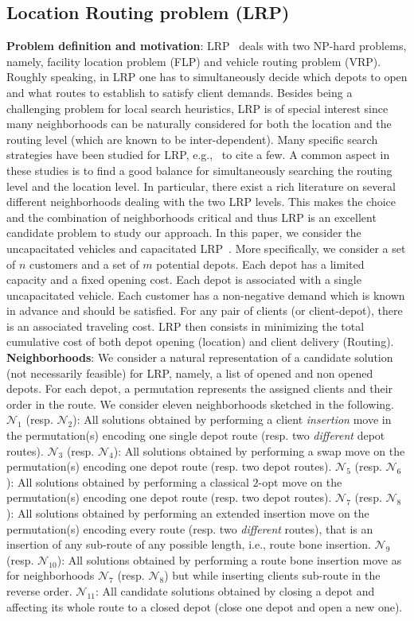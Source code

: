 \documentclass{acm_proc_article-sp}
\newcommand{\m}[1]{\mathcal{#1}}
\begin{document}
\subsection{Location Routing problem (LRP)}
\textbf{Problem definition and motivation}: LRP~\cite{lrp,Min} deals with two NP-hard problems, namely, facility location problem (FLP) and vehicle routing problem (VRP). Roughly speaking, in LRP one has to simultaneously decide which depots to open and what routes to establish to satisfy client demands. 
Besides being a challenging problem for local search heuristics, LRP is of special interest since many neighborhoods can be naturally considered for both the location and the routing level (which are known to be inter-dependent). Many specific search strategies have been studied for LRP, e.g.,~\cite{galrp,lrpvns,duhamel} to cite a few. A common aspect in these studies is to find a good balance for simultaneously searching the routing level and the location level. In particular, there exist a rich literature on several different neighborhoods dealing with the two LRP levels. This makes the choice and the combination of neighborhoods critical and thus LRP is an excellent candidate problem to study our approach. In this paper, we consider the uncapacitated vehicles and capacitated LRP~\cite{ulrp}. More specifically, we consider a set of $n$ customers and a set of $m$ potential depots. Each depot has a limited capacity and a fixed opening cost. Each depot is associated with a single uncapacitated vehicle. Each customer has a non-negative demand which is known in advance and should be satisfied. For any pair of clients (or client-depot), there is an associated traveling cost. LRP then consists in minimizing the total cumulative cost of both depot opening (location) and client delivery (Routing).\\
\textbf{Neighborhoods}: We consider a natural representation of a candidate solution (not necessarily feasible) for LRP, namely, a list of opened and non opened depots. For each depot, a permutation represents the assigned clients and their order in the route. We consider eleven neighborhoods sketched in the following. $\m{N}_1$ (resp. $\m{N}_2$): All solutions obtained by performing a client \emph{insertion} move in the permutation(s) encoding one single depot route (resp. two \emph{different} depot routes). $\m{N}_3$ (resp. $\m{N}_4$): All solutions obtained by performing a swap move on the permutation(s) encoding one depot route (resp. two depot routes). $\m{N}_5$ (resp. $\m{N}_6$): All solutions obtained by performing a classical $2$-opt move on the permutation(s) encoding one depot route (resp. two depot routes). $\m{N}_7$ (resp. $\m{N}_8$): All solutions obtained by performing an extended insertion move on the permutation(s) encoding every route (resp. two \emph{different} routes), that is an insertion of any sub-route of any possible length, i.e., route bone insertion. $\m{N}_{9}$ (resp. $\m{N}_{10}$): All solutions obtained by performing a route bone insertion move as for neighborhoods $\m{N}_7$ (resp. $\m{N}_8$) but while inserting clients sub-route in the reverse order. $\m{N}_{11}$: All candidate solutions obtained by closing a depot and affecting its whole route to a closed depot (close one depot and open a new one).\\
\end{document}

